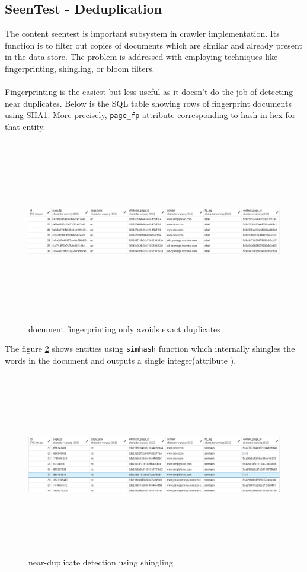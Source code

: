 \subsection{SeenTest - Deduplication}
The content seentest is important subsystem in crawler implementation. Its function is to filter out
copies of documents which are similar and already present in the data store. The problem is addressed
with employing techniques like fingerprinting, shingling, or bloom filters.
\\
\\
Fingerprinting is the easiest but less useful as it doesn't do the job of detecting near duplicates.
Below is the SQL table showing rows of fingerprint documents using SHA1. More precisely, \texttt{page\_fp}
attribute corresponding to hash in hex for that entity.

\begin{figure}[h!]
  \centering
  \includegraphics[width=18cm,height=8cm,keepaspectratio]{../media/crawler/fingerprinting.png}
  \caption{document fingerprinting only avoids exact duplicates}
  \label{fig:fingerprinting}
\end{figure}

\noindent
The figure \ref{fig:simhashing} shows entities using \texttt{simhash}\cite{dedupe} function which
internally shingles the words in the document and outputs a single integer(attribute ).
\begin{figure}[h!]
  \centering
  \includegraphics[width=18cm,height=8cm,keepaspectratio]{../media/crawler/shingles.png}
  \caption{near-duplicate detection using shingling\cite{dedupe}}
  \label{fig:simhashing}
\end{figure}

